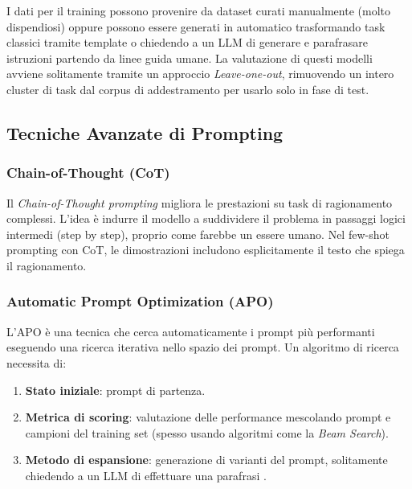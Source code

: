             I dati per il training possono provenire da dataset curati manualmente (molto dispendiosi) oppure possono essere generati in automatico trasformando task classici tramite template o chiedendo a un LLM di generare e parafrasare istruzioni partendo da linee guida umane. La valutazione di questi modelli avviene solitamente tramite un approccio \textit{Leave-one-out}, rimuovendo un intero cluster di task dal corpus di addestramento per usarlo solo in fase di test.

    \subsection{Tecniche Avanzate di Prompting}

        \subsubsection{Chain-of-Thought (CoT)}
        
            Il \textit{Chain-of-Thought prompting} migliora le prestazioni su task di ragionamento complessi. L'idea è indurre il modello a suddividere il problema in passaggi logici intermedi (step by step), proprio come farebbe un essere umano. Nel few-shot prompting con CoT, le dimostrazioni includono esplicitamente il testo che spiega il ragionamento.

        \subsubsection{Automatic Prompt Optimization (APO)}

            L'APO è una tecnica che cerca automaticamente i prompt più performanti eseguendo una ricerca iterativa nello spazio dei prompt. Un algoritmo di ricerca necessita di:
            
            \begin{enumerate}
                \item \textbf{Stato iniziale}: prompt di partenza.
                \item \textbf{Metrica di scoring}: valutazione delle performance mescolando prompt e campioni del training set (spesso usando algoritmi come la \textit{Beam Search}).
                \item \textbf{Metodo di espansione}: generazione di varianti del prompt, solitamente chiedendo a un LLM di effettuare una parafrasi .
            \end{enumerate}
            
